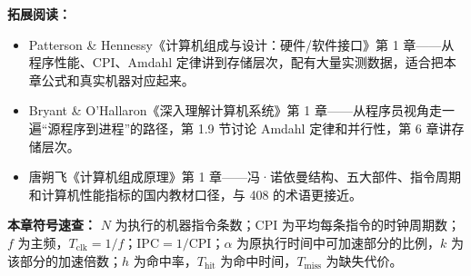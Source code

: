 \noindent\textbf{拓展阅读：}
\begin{itemize}
    \item Patterson \& Hennessy《计算机组成与设计：硬件/软件接口》第 1 章——从程序性能、CPI、Amdahl 定律讲到存储层次，配有大量实测数据，适合把本章公式和真实机器对应起来。
    \item Bryant \& O'Hallaron《深入理解计算机系统》第 1 章——从程序员视角走一遍“源程序到进程”的路径，第 1.9 节讨论 Amdahl 定律和并行性，第 6 章讲存储层次。
    \item 唐朔飞《计算机组成原理》第 1 章——冯·诺依曼结构、五大部件、指令周期和计算机性能指标的国内教材口径，与 408 的术语更接近。
\end{itemize}

\noindent\textbf{本章符号速查：} $N$ 为执行的机器指令条数；$\mathrm{CPI}$ 为平均每条指令的时钟周期数；$f$ 为主频，$T_{\text{clk}}=1/f$；$\mathrm{IPC}=1/\mathrm{CPI}$；$\alpha$ 为原执行时间中可加速部分的比例，$k$ 为该部分的加速倍数；$h$ 为命中率，$T_{\text{hit}}$ 为命中时间，$T_{\text{miss}}$ 为缺失代价。

\newpage

